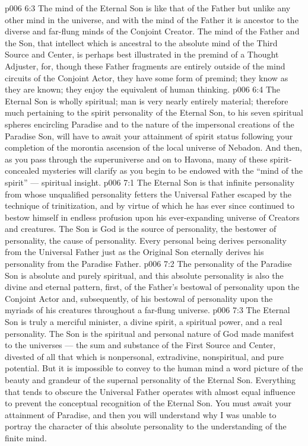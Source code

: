\vs p006 6:3 The mind of the Eternal Son is like that of the Father but unlike any other mind in the universe, and with the mind of the Father it is ancestor to the diverse and far\hyp{}flung minds of the Conjoint Creator. The mind of the Father and the Son, that intellect which is ancestral to the absolute mind of the Third Source and Center, is perhaps best illustrated in the premind of a Thought Adjuster, for, though these Father fragments are entirely outside of the mind circuits of the Conjoint Actor, they have some form of premind; they know as they are known; they enjoy the equivalent of human thinking.
\vs p006 6:4 The Eternal Son is wholly spiritual; man is very nearly entirely material; therefore much pertaining to the spirit personality of the Eternal Son, to his seven spiritual spheres encircling Paradise and to the nature of the impersonal creations of the Paradise Son, will have to await your attainment of spirit status following your completion of the morontia ascension of the local universe of Nebadon. And then, as you pass through the superuniverse and on to Havona, many of these spirit\hyp{}concealed mysteries will clarify as you begin to be endowed with the “mind of the spirit” --- spiritual insight.
\vs p006 7:1 The Eternal Son is that infinite personality from whose unqualified personality fetters the Universal Father escaped by the technique of trinitization, and by virtue of which he has ever since continued to bestow himself in endless profusion upon his ever\hyp{}expanding universe of Creators and creatures. The Son is  God is  the source of personality, the bestower of personality, the cause of personality. Every personal being derives personality from the Universal Father just as the Original Son eternally derives his personality from the Paradise Father.
\vs p006 7:2 The personality of the Paradise Son is absolute and purely spiritual, and this absolute personality is also the divine and eternal pattern, first, of the Father’s bestowal of personality upon the Conjoint Actor and, subsequently, of his bestowal of personality upon the myriads of his creatures throughout a far\hyp{}flung universe.
\vs p006 7:3 The Eternal Son is truly a merciful minister, a divine spirit, a spiritual power, and a real personality. The Son is the spiritual and personal nature of God made manifest to the universes --- the sum and substance of the First Source and Center, divested of all that which is nonpersonal, extradivine, nonspiritual, and pure potential. But it is impossible to convey to the human mind a word picture of the beauty and grandeur of the supernal personality of the Eternal Son. Everything that tends to obscure the Universal Father operates with almost equal influence to prevent the conceptual recognition of the Eternal Son. You must await your attainment of Paradise, and then you will understand why I was unable to portray the character of this absolute personality to the understanding of the finite mind.
